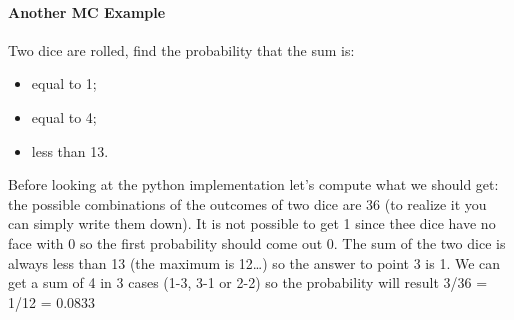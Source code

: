 \documentclass[11pt]{article}
\providecommand{\tightlist}{%
      \setlength{\itemsep}{0pt}\setlength{\parskip}{0pt}}
\begin{document}
    \hypertarget{another-mc-example}{%
\paragraph{Another MC Example}\label{another-mc-example}}

Two dice are rolled, find the probability that the sum is:

\begin{itemize}
\tightlist
\item
  equal to 1;
\item
  equal to 4;
\item
  less than 13.
\end{itemize}

Before looking at the python implementation let's compute what we should
get: the possible combinations of the outcomes of two dice are 36 (to
realize it you can simply write them down). It is not possible to get 1
since thee dice have no face with 0 so the first probability should come
out 0. The sum of the two dice is always less than 13 (the maximum is
12\ldots{}) so the answer to point 3 is 1. We can get a sum of 4 in 3
cases (1-3, 3-1 or 2-2) so the probability will result 3/36 = 1/12 =
0.0833
\end{document}
